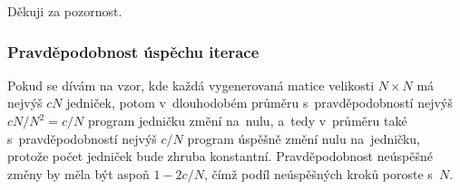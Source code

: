 \documentclass{beamer}
\begin{document}
\begin{frame}
\centering
Děkuji za pozornost.
\end{frame}

\begin{frame}
\frametitle{Pravděpodobnost úspěchu iterace}
Pokud se dívám na vzor, kde každá vygenerovaná matice velikosti $N\times N$ má nejvýš $cN$ jedniček, potom v~dlouhodobém průměru s~pravděpodobností nejvýš $cN/N^2=c/N$ program jedničku změní na~nulu, a~tedy v~průměru také s~pravděpodobností nejvýš $c/N$ program úspěšně změní nulu na~jedničku, protože počet jedniček bude zhruba konstantní. Pravděpodobnost neúspěšné změny by měla být aspoň $1-2c/N$, čímž podíl neúspěšných kroků poroste s~$N$.
\end{frame}





\end{document}
